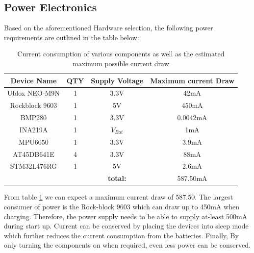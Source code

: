  \subsection{Power Electronics}
 
 Based on the aforementioned Hardware selection, the following power requirements are outlined in the table below:
 
 \begin{table}[H]
     \centering
      \caption{Current consumption of various components as well as the estimated maximum possible current draw}
     \begin{tabular}{|c|c |c|c|}
         \hline
         Device Name & QTY &  Supply Voltage & Maximum current Draw\\
         \hline
         Ublox NEO-M9N & 1 & 3.3V & 42mA \\
         \hline
         Rockblock 9603 & 1 & 5V &  450mA\\
         \hline
         BMP280 & 1 & 3.3V & 0.0042mA\\
         \hline
         INA219A & 1 & $V_{Bat}$ & 1mA\\
         MPU6050 & 1 & 3.3V & 3.9mA\\
         \hline 
         AT45DB641E & 4 & 3.3V & 88mA\\
         \hline
         STM32L476RG & 1 & 5V & 2.6mA\\
         \hline
         \cline{4-4}
         \multicolumn{2}{c}{} &\multicolumn{1}{c}{\textbf{total:}} & \multicolumn{1}{c}{587.50mA} \\
         \cline{4-4}
         \cline{4-4}
     \end{tabular}

     \label{tab:pow_budget}
 \end{table}
 
 From table \ref{tab:pow_budget} we can expect a maximum current draw of 587.50. The largest consumer of power is the Rock-block 9603 which can draw up to 450mA when charging. Therefore, the power supply needs to be able to supply at-least 500mA during start up. Current can be conserved by placing the devices into sleep mode which further reduces the current consumption from the batteries. Finally, By only turning the components on when required, even less power can be conserved. \par 
 
